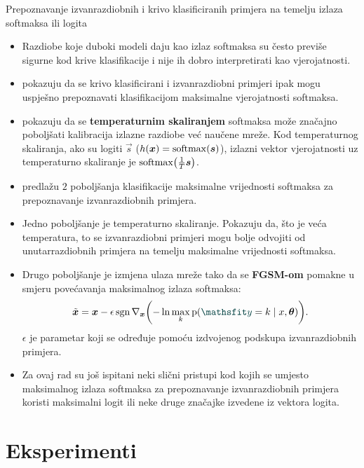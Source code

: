 \documentclass{beamer}
\begin{document}
\begin{frame}[allowframebreaks=0.9]{Prepoznavanje izvanrazdiobnih i krivo klasificiranih primjera na temelju izlaza softmaksa ili logita}
\begin{itemize}
	\item Razdiobe koje duboki modeli daju kao izlaz softmaksa su često previše sigurne kod krive klasifikacije i nije ih dobro interpretirati kao vjerojatnosti.
	\item \citet{Hendrycks:2016:BDMOODE} pokazuju da se krivo klasificirani i izvanrazdiobni primjeri ipak mogu uspješno prepoznavati klasifikacijom maksimalne vjerojatnosti softmaksa. 
	\item \citet{Guo:2017:CMNN} pokazuju da se \textbf{temperaturnim skaliranjem} softmaksa može značajno poboljšati kalibracija izlazne razdiobe već naučene mreže. Kod temperaturnog skaliranja, ako su logiti $\vec s$ ($h(\vec x)=\softmax(\vec s)$), izlazni vektor vjerojatnosti uz temperaturno skaliranje je $\softmax\del{\frac{1}{T}\vec s}$.	
	\item \citet{Liang:2017:PDOODENN} predlažu $2$ poboljšanja klasifikacije maksimalne vrijednosti softmaksa za prepoznavanje izvanrazdiobnih primjera. 
	\item Jedno poboljšanje je temperaturno skaliranje. Pokazuju da, što je veća temperatura, to se izvanrazdiobni primjeri mogu bolje odvojiti od unutarrazdiobnih primjera na temelju maksimalne vrijednosti softmaksa. 
	\item Drugo poboljšanje je izmjena ulaza mreže tako da se \textbf{FGSM-om} pomakne u smjeru povećavanja maksimalnog izlaza softmaksa:
	\begin{equation} \label{eq:ODIN-FGSM}
	\tilde{\vec x} = \vec x - \epsilon\sgn\nabla_{\vec x}\del{-\ln \max_k \p(\rvar y=k\mid x,\vec\theta)} \text{.}
	\end{equation}
	$\epsilon$ je parametar koji se određuje pomoću izdvojenog podskupa izvanrazdiobnih primjera.		
	\item Za ovaj rad su još ispitani neki slični pristupi kod kojih se umjesto maksimalnog izlaza softmaksa za prepoznavanje izvanrazdiobnih primjera koristi maksimalni logit ili neke druge značajke izvedene iz vektora logita.
\end{itemize}
\end{frame}


\section{Eksperimenti}
\end{document}
